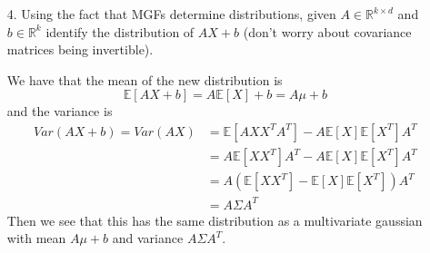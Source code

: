 \documentclass{article}
\begin{document}
\begin{itemize}
            \item [4.] Using the fact that MGFs determine distributions, given $A \in \mathbb{R}^{k \times d}$ and $b \in \mathbb{R}^{k}$ identify the distribution of $AX + b$ (don't worry about covariance matrices being invertible).
                \begin{answer}
                    We have that the mean of the new distribution is
                        \begin{equation*}
                            \mathbb{E}[AX + b] = A \mathbb{E}[X] + b = A \mu + b
                        \end{equation*}
                    and the variance is
                        \begin{align*}
                            Var(AX + b) = Var(AX) &= \mathbb{E}[AXX^{T}A^{T}] - A\mathbb{E}[X]\mathbb{E}[X^{T}]A^{T}  \\
                                                  &= A \mathbb{E}[XX^{T}]A^{T} - A\mathbb{E}[X]\mathbb{E}[X^{T}]A^{T} \\
                                                  &= A(\mathbb{E}[XX^{T}] - \mathbb{E}[X]\mathbb{E}[X^{T}])A^{T}      \\
                                                  &= A\Sigma A^{T}                                                      
                        \end{align*}
                    Then we see that this has the same distribution as a multivariate gaussian with mean $A\mu + b$ and variance $A\Sigma A^{T}$.
                \end{answer}


\end{itemize}
\end{document}
